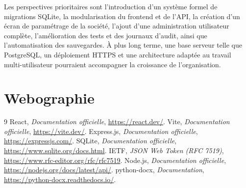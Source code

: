 \documentclass[12pt,a4paper,oneside]{report}
\begin{document}
Les perspectives prioritaires sont l'introduction d'un système formel de migrations SQLite, la modularisation du frontend et de l'API, la création d'un écran de paramétrage de la société, l'ajout d'une administration utilisateur complète, l'amélioration des tests et des journaux d'audit, ainsi que l'automatisation des sauvegardes. À plus long terme, une base serveur telle que PostgreSQL, un déploiement HTTPS et une architecture adaptée au travail multi-utilisateur pourraient accompagner la croissance de l'organisation.

\chapter*{Webographie}
\begin{thebibliography}{9}
 React, \emph{Documentation officielle}, \url{https://react.dev/}.
 Vite, \emph{Documentation officielle}, \url{https://vite.dev/}.
 Express.js, \emph{Documentation officielle}, \url{https://expressjs.com/}.
 SQLite, \emph{Documentation officielle}, \url{https://www.sqlite.org/docs.html}.
 IETF, \emph{JSON Web Token (RFC 7519)}, \url{https://www.rfc-editor.org/rfc/rfc7519}.
 Node.js, \emph{Documentation officielle}, \url{https://nodejs.org/docs/latest/api/}.
 python-docx, \emph{Documentation}, \url{https://python-docx.readthedocs.io/}.
\end{thebibliography}

\appendix
\end{document}
